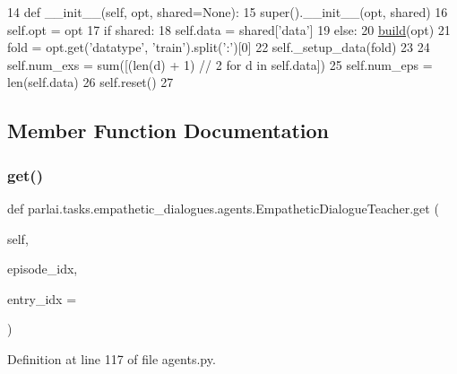 \begin{DoxyCode}
14     \textcolor{keyword}{def }\_\_init\_\_(self, opt, shared=None):
15         super().\_\_init\_\_(opt, shared)
16         self.opt = opt
17         \textcolor{keywordflow}{if} shared:
18             self.data = shared[\textcolor{stringliteral}{'data'}]
19         \textcolor{keywordflow}{else}:
20             \hyperlink{namespaceparlai_1_1mturk_1_1tasks_1_1talkthewalk_1_1download_a8c0fbb9b6dfe127cb8c1bd6e7c4e33fd}{build}(opt)
21             fold = opt.get(\textcolor{stringliteral}{'datatype'}, \textcolor{stringliteral}{'train'}).split(\textcolor{stringliteral}{':'})[0]
22             self.\_setup\_data(fold)
23 
24         self.num\_exs = sum([(len(d) + 1) // 2 \textcolor{keywordflow}{for} d \textcolor{keywordflow}{in} self.data])
25         self.num\_eps = len(self.data)
26         self.reset()
27 
\end{DoxyCode}


\subsection{Member Function Documentation}
\mbox{\label{classparlai_1_1tasks_1_1empathetic__dialogues_1_1agents_1_1EmpatheticDialogueTeacher_aabbb16fc89a8537631c13b3569efd223}} 
\subsubsection{\texorpdfstring{get()}{get()}}
{\footnotesize\ttfamily def parlai.\+tasks.\+empathetic\+\_\+dialogues.\+agents.\+Empathetic\+Dialogue\+Teacher.\+get (\begin{DoxyParamCaption}\item[{}]{self,  }\item[{}]{episode\+\_\+idx,  }\item[{}]{entry\+\_\+idx = {} }\end{DoxyParamCaption})}



Definition at line 117 of file agents.\+py.


